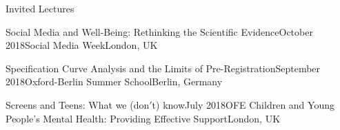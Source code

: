 \documentclass{resume} %
\begin{document}
\begin{rSection}{Invited Lectures}

\begin{rSubsection}{Social Media and Well-Being: Rethinking the Scientific Evidence}{October 2018}{Social Media Week}{London, UK}
\item[]\vspace{-1.5\baselineskip}
\end{rSubsection}


\begin{rSubsection}{Specification Curve Analysis and the Limits of Pre-Registration}{September 2018}{Oxford-Berlin Summer School}{Berlin, Germany}
\item[]\vspace{-1.5\baselineskip}
\end{rSubsection}


\begin{rSubsection}{Screens and Teens: What we (don$'$t) know}{July 2018}{OFE Children and Young People’s Mental Health: Providing Effective Support}{London, UK}
\item[]\vspace{-1.5\baselineskip}
\end{rSubsection}

\end{rSection}
\end{document}
